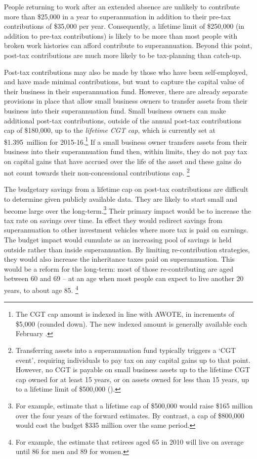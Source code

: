 \documentclass{grattanAlpha}
\begin{document}
People returning to work after an extended absence are unlikely to contribute more than \$25,000 in a year to superannuation in addition to their pre-tax contributions of \$35,000 per year.  Consequently, a lifetime limit of \$250,000 (in addition to pre-tax contributions) is likely to be more than most people with broken work histories can afford contribute to superannuation. Beyond this point, post-tax contributions are much more likely to be tax-planning than catch-up. 

Post-tax contributions may also be made by those who have been self-employed, and have made minimal contributions, but want to capture the capital value of their business in their superannuation fund. However, there are already separate provisions in place that allow small business owners to transfer assets from their business into their superannuation fund. Small business owners can make additional post-tax contributions, outside of the annual post-tax contributions cap of \$180,000, up to the \emph{lifetime CGT cap}, which is currently set at \$1.395~million for 2015-16.\footnote{The CGT cap amount is indexed in line with AWOTE, in increments of \$5,000 (rounded down). The new indexed amount is generally available each February \textcite{ATO2015CGT-cap-amount}.}  If a small business owner transfers assets from their business into their superannuation fund then, within limits, they do not pay tax on capital gains that have accrued over the life of the asset and these gains do not count towards their non-concessional contributions cap.%
\footnote{Transferring\label{fn:172} assets into a superannuation fund typically triggers a ‘CGT event’, requiring individuals to pay tax on any capital gains up to that point. However, no CGT is payable on small business assets up to the lifetime CGT cap owned for at least 15 years, or on assets owned for less than 15 years, up to a lifetime limit of \$500,000 (\textcite{ATO2015-Small-business-entity-concessions}).}

The budgetary savings from a lifetime cap on post-tax contributions are difficult to determine given publicly available data. They are likely to start small and become large over the long-term.\footnote{For example, \textcite{PBO2015-Super-for-retirement-not-tax-minimisation} estimate that a lifetime cap of \$500,000 would raise \$165 million over the four years of the forward estimates. By contrast, a cap of \$800,000 would cost the budget \$335 million over the same period.}  Their primary impact would be to increase the tax rate on savings over time. In effect they would redirect savings from superannuation to other investment vehicles where more tax is paid on earnings. The budget impact would cumulate as an increasing pool of savings is held outside rather than inside superannuation. By limiting re-contribution strategies, they would also increase the inheritance taxes paid on superannuation. This would be a reform for the long-term: most of those re-contributing are aged between 60 and 69 – at an age when most people can expect to live another 20 years, to about age 85.%
\footnote{For example, the \textcite[][6]{ActuariesInstitute2012-Australias-Longevity-Tsunami}  estimate that retirees aged 65 in 2010 will live on average until 86 for men and 89 for women.}  
\end{document}
